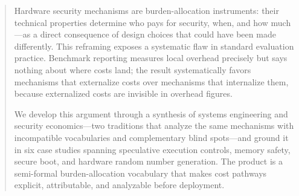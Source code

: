 \begin{abstract}
Hardware security mechanisms are burden-allocation instruments: their technical
properties determine who pays for security, when, and how much---as a direct
consequence of design choices that could have been made differently. This reframing
exposes a systematic flaw in standard evaluation practice. Benchmark reporting
measures local overhead precisely but says nothing about where costs land; the
result systematically favors mechanisms that externalize costs over mechanisms
that internalize them, because externalized costs are invisible in overhead figures.

We develop this argument through a synthesis of systems engineering and security
economics---two traditions that analyze the same mechanisms with incompatible
vocabularies and complementary blind spots---and ground it in six case studies
spanning speculative execution controls, memory safety, secure boot, and hardware
random number generation. The product is a semi-formal burden-allocation vocabulary
that makes cost pathways explicit, attributable, and analyzable before deployment.
\end{abstract}